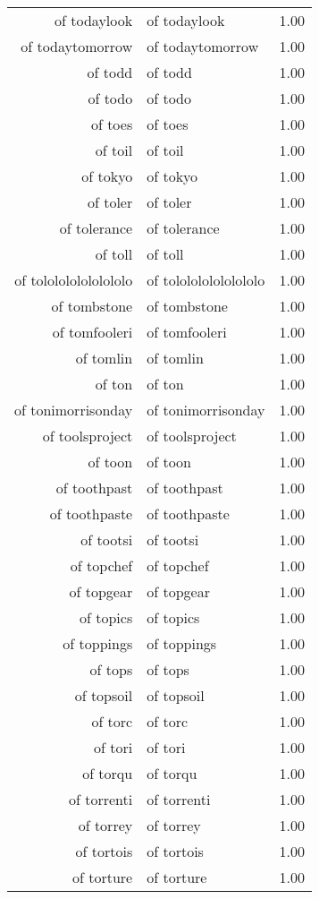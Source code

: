 \begin{table}[ht]
\begin{tabular}{rlr}
  of todaylook & of todaylook & 1.00 \\ 
  of todaytomorrow & of todaytomorrow & 1.00 \\ 
  of todd & of todd & 1.00 \\ 
  of todo & of todo & 1.00 \\ 
  of toes & of toes & 1.00 \\ 
  of toil & of toil & 1.00 \\ 
  of tokyo & of tokyo & 1.00 \\ 
  of toler & of toler & 1.00 \\ 
  of tolerance & of tolerance & 1.00 \\ 
  of toll & of toll & 1.00 \\ 
  of tololololololololo & of tololololololololo & 1.00 \\ 
  of tombstone & of tombstone & 1.00 \\ 
  of tomfooleri & of tomfooleri & 1.00 \\ 
  of tomlin & of tomlin & 1.00 \\ 
  of ton & of ton & 1.00 \\ 
  of tonimorrisonday & of tonimorrisonday & 1.00 \\ 
  of toolsproject & of toolsproject & 1.00 \\ 
  of toon & of toon & 1.00 \\ 
  of toothpast & of toothpast & 1.00 \\ 
  of toothpaste & of toothpaste & 1.00 \\ 
  of tootsi & of tootsi & 1.00 \\ 
  of topchef & of topchef & 1.00 \\ 
  of topgear & of topgear & 1.00 \\ 
  of topics & of topics & 1.00 \\ 
  of toppings & of toppings & 1.00 \\ 
  of tops & of tops & 1.00 \\ 
  of topsoil & of topsoil & 1.00 \\ 
  of torc & of torc & 1.00 \\ 
  of tori & of tori & 1.00 \\ 
  of torqu & of torqu & 1.00 \\ 
  of torrenti & of torrenti & 1.00 \\ 
  of torrey & of torrey & 1.00 \\ 
  of tortois & of tortois & 1.00 \\ 
  of torture & of torture & 1.00 \\ 

\end{tabular}
\end{table}
